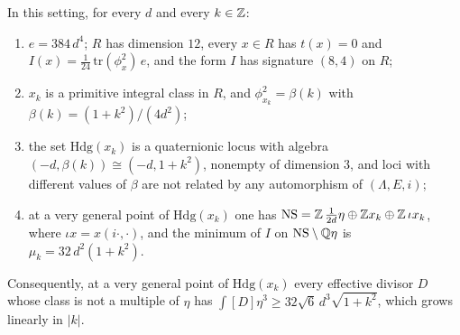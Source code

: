 \begin{proposition}\label{prop:pencil}
In this setting, for every $d$ and every $k\in\mathbb{Z}$:
\begin{enumerate}[label=\textup{(\roman*)},nosep]
\item $e=384\,d^{4}$; $R$ has dimension $12$, every $x\in R$ has $t(x)=0$
  and $I(x)=\tfrac{1}{24}\,\mathrm{tr}(\phi_{x}^{2})\,e$, and the form $I$ has
  signature $(8,4)$ on $R$;
\item $x_{k}$ is a primitive integral class in $R$, and
  $\phi_{x_{k}}^{2}=\beta(k)$ with $\beta(k)=(1+k^{2})/(4d^{2})$;
\item the set $\mathrm{Hdg}(x_{k})$ is a quaternionic locus with algebra
  $(-d,\beta(k))\cong(-d,1+k^{2})$, nonempty of dimension $3$, and loci with
  different values of $\beta$ are not related by any automorphism of
  $(\Lambda,E,i)$;
\item at a very general point of $\mathrm{Hdg}(x_{k})$ one has
  $\mathrm{NS}=\mathbb{Z}\,\tfrac{1}{2d}\eta\oplus\mathbb{Z} x_{k}\oplus\mathbb{Z}\,\iota x_{k}$, where
  $\iota x=x(i\cdot,\cdot)$, and the minimum of $I$ on $\mathrm{NS}\setminus\mathbb{Q}\eta$
  is $\mu_{k}=32\,d^{2}(1+k^{2})$.
\end{enumerate}
Consequently, at a very general point of $\mathrm{Hdg}(x_{k})$ every effective
divisor $D$ whose class is not a multiple of $\eta$ has
$\int[D]\eta^{3}\ge32\sqrt{6}\,d^{3}\sqrt{1+k^{2}}$, which grows linearly in
$|k|$.
\end{proposition}

